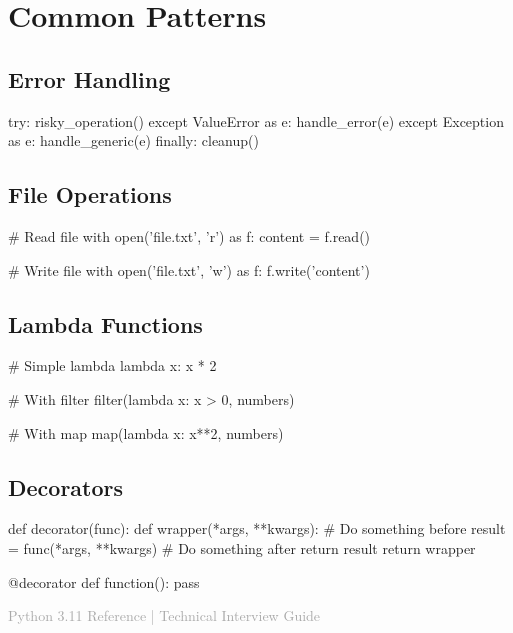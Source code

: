 \documentclass[11pt]{article}
\begin{document}
\section{Common Patterns}

\begin{multicols}{3}
  \subsection{Error Handling}
  \begin{moderncode}
try:
    risky_operation()
except ValueError as e:
    handle_error(e)
except Exception as e:
    handle_generic(e)
finally:
    cleanup()
  \end{moderncode}
  
  \subsection{File Operations}
  \begin{moderncode}
\# Read file
with open('file.txt', 'r') as f:
    content = f.read()

\# Write file
with open('file.txt', 'w') as f:
    f.write('content')
  \end{moderncode}
\end{multicols}

\begin{multicols}{3}
  \subsection{Lambda Functions}
  \begin{moderncode}
\# Simple lambda
lambda x: x * 2

\# With filter
filter(lambda x: x > 0, numbers)

\# With map
map(lambda x: x**2, numbers)
  \end{moderncode}
  
  \subsection{Decorators}
  \begin{moderncode}
def decorator(func):
    def wrapper(*args, **kwargs):
        \# Do something before
        result = func(*args, **kwargs)
        \# Do something after
        return result
    return wrapper

@decorator
def function():
    pass
  \end{moderncode}
\end{multicols}


\vfill
\begin{center}
  \textcolor{darkgray}{\small Python 3.11 Reference \quad | \quad Technical Interview Guide}
\end{center}
\end{document}
